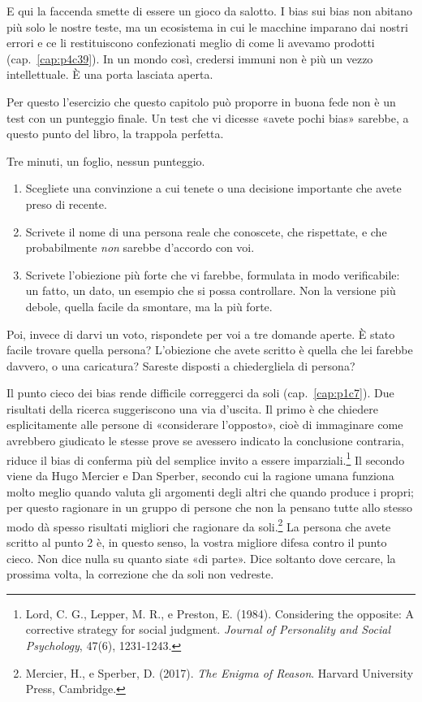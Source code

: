 E qui la faccenda smette di essere un gioco da salotto. I bias sui bias non abitano più solo le nostre teste, ma un ecosistema in cui le macchine imparano dai nostri errori e ce li restituiscono confezionati meglio di come li avevamo prodotti (cap.~\ref{cap:p4c39}). In un mondo così, credersi immuni non è più un vezzo intellettuale. È una porta lasciata aperta.

Per questo l'esercizio che questo capitolo può proporre in buona fede non è un test con un punteggio finale. Un test che vi dicesse «avete pochi bias» sarebbe, a questo punto del libro, la trappola perfetta.

\begin{provatu}
Tre minuti, un foglio, nessun punteggio.

\begin{enumerate}[leftmargin=*,itemsep=2pt]
	\item Scegliete una convinzione a cui tenete o una decisione importante che avete preso di recente.
	\item Scrivete il nome di una persona reale che conoscete, che rispettate, e che probabilmente \textit{non} sarebbe d'accordo con voi.
	\item Scrivete l'obiezione più forte che vi farebbe, formulata in modo verificabile: un fatto, un dato, un esempio che si possa controllare. Non la versione più debole, quella facile da smontare, ma la più forte.
\end{enumerate}

Poi, invece di darvi un voto, rispondete per voi a tre domande aperte. È stato facile trovare quella persona? L'obiezione che avete scritto è quella che lei farebbe davvero, o una caricatura? Sareste disposti a chiedergliela di persona?

\spiegazione Il punto cieco dei bias rende difficile correggerci da soli (cap.~\ref{cap:p1c7}). Due risultati della ricerca suggeriscono una via d'uscita. Il primo è che chiedere esplicitamente alle persone di «considerare l'opposto», cioè di immaginare come avrebbero giudicato le stesse prove se avessero indicato la conclusione contraria, riduce il bias di conferma più del semplice invito a essere imparziali.\footnote{Lord, C. G., Lepper, M. R., e Preston, E. (1984). Considering the opposite: A corrective strategy for social judgment. \textit{Journal of Personality and Social Psychology}, 47(6), 1231-1243.} Il secondo viene da Hugo Mercier e Dan Sperber, secondo cui la ragione umana funziona molto meglio quando valuta gli argomenti degli altri che quando produce i propri; per questo ragionare in un gruppo di persone che non la pensano tutte allo stesso modo dà spesso risultati migliori che ragionare da soli.\footnote{Mercier, H., e Sperber, D. (2017). \textit{The Enigma of Reason}. Harvard University Press, Cambridge.} La persona che avete scritto al punto 2 è, in questo senso, la vostra migliore difesa contro il punto cieco. Non dice nulla su quanto siate «di parte». Dice soltanto dove cercare, la prossima volta, la correzione che da soli non vedreste.
\end{provatu}

